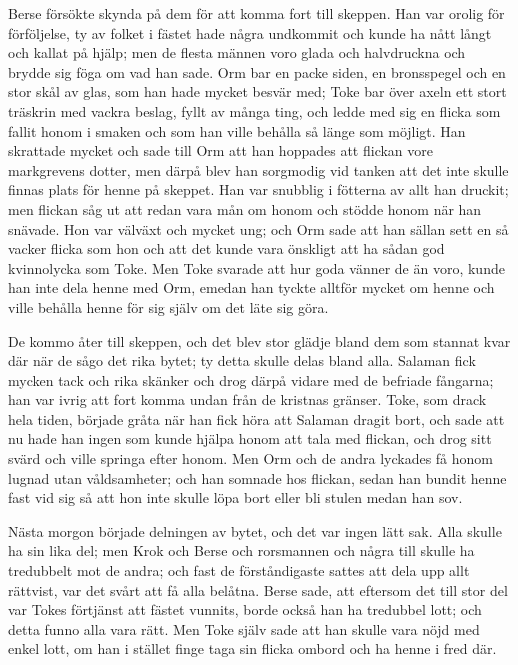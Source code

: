 \initial Berse försökte skynda på dem för att komma fort till skeppen. Han var orolig för förföljelse, ty av folket i fästet hade några undkommit och kunde ha nått långt och kallat på hjälp; men de flesta männen voro glada och halvdruckna och brydde sig föga om vad han sade. Orm bar en packe siden, en bronsspegel och en stor skål av glas, som han hade mycket besvär med; Toke bar över axeln ett stort träskrin med vackra beslag, fyllt av många ting, och ledde med sig en flicka som fallit honom i smaken och som han ville behålla så länge som möjligt. Han skrattade mycket och sade till Orm att han hoppades att flickan vore markgrevens dotter, men därpå blev han sorgmodig vid tanken att det inte skulle finnas plats för henne på skeppet. Han var snubblig i fötterna av allt han druckit; men flickan såg ut att redan vara mån om honom och stödde honom när han snävade. Hon var välväxt och mycket ung; och Orm sade att han sällan sett en så vacker flicka som hon och att det kunde vara önskligt att ha sådan god kvinnolycka som Toke. Men Toke svarade att hur goda vänner de än voro, kunde han inte dela henne med Orm, emedan han tyckte alltför mycket om henne och ville behålla henne för sig själv om det läte sig göra.

\initial De kommo åter till skeppen, och det blev stor glädje bland dem som stannat kvar där när de sågo det rika bytet; ty detta skulle delas bland alla. Salaman fick mycken tack och rika skänker och drog därpå vidare med de befriade fångarna; han var ivrig att fort komma undan från de kristnas gränser. Toke, som drack hela tiden, började gråta när han fick höra att Salaman dragit bort, och sade att nu hade han ingen som kunde hjälpa honom att tala med flickan, och drog sitt svärd och ville springa efter honom. Men Orm och de andra lyckades få honom lugnad utan våldsamheter; och han somnade hos flickan, sedan han bundit henne fast vid sig så att hon inte skulle löpa bort eller bli stulen medan han sov.

\initial Nästa morgon började delningen av bytet, och det var ingen lätt sak. Alla skulle ha sin lika del; men Krok och Berse och rorsmannen och några till skulle ha tredubbelt mot de andra; och fast de förståndigaste sattes att dela upp allt rättvist, var det svårt att få alla belåtna. Berse sade, att eftersom det till stor del var Tokes förtjänst att fästet vunnits, borde också han ha tredubbel lott; och detta funno alla vara rätt. Men Toke själv sade att han skulle vara nöjd med enkel lott, om han i stället finge taga sin flicka ombord och ha henne i fred där.

